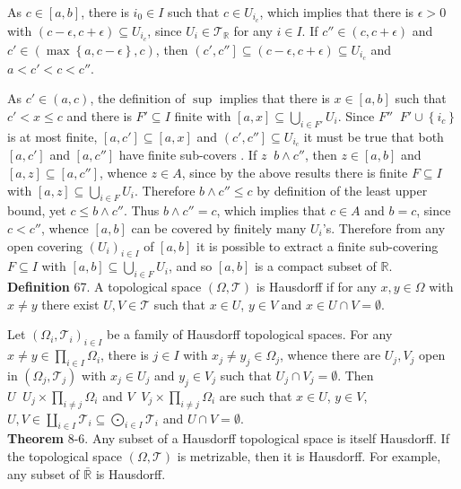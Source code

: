 \documentclass[a4paper]{article}
\newcommand{\obj}[1]{\left\{ #1 \right \}}
\newcommand{\clo}[1]{\left [ #1 \right ]}
\newcommand{\ploc}[1]{\left ( #1 \right ]}
\newcommand{\brac}[1]{\left ( #1 \right )}
\newcommand{\Rbar}{{\bar{\mathbb{R}}}}
\newcommand{\Real}{\mathbb{R}}
\newcommand{\Tcal}{\mathcal{T}}
\newcommand{\defn}{\mathop{\overset{\Delta}{=}}\nolimits}
\begin{document}
As $c\in \clo{a,b}$, there is $i_0\in I$ such that $c\in U_{i_c}$, which implies that there is $\epsilon>0$ with $\brac{c-\epsilon, c+\epsilon} \subseteq U_{i_c}$, since $U_i\in \Tcal_\Real$ for any $i\in I$. If $c'' \in \brac{c, c+\epsilon}$ and $c'\in \brac{\max\obj{a, c-\epsilon}, c}$, then $\ploc{c', c''}\subseteq \brac{c-\epsilon, c+\epsilon} \subseteq U_{i_c}$ and $a < c'< c < c''$.

As $c'\in \brac{a, c}$, the definition of $\sup$ implies that there is $x\in \clo{a,b}$ such that $c'< x \leq c$ and there is $F'\subseteq I$ finite with $\clo{a,x}\subseteq \bigcup_{i\in F'} U_i$. Since $F''\defn F'\cup \obj{i_c}$ is at most finite, $\clo{a, c'}\subseteq \clo{a,x}$ and $\ploc{c', c''}\subseteq U_{i_c}$ it must be true that both $\clo{a, c'}$ and $\clo{a, c''}$ have finite sub-covers . If $z\defn b\wedge c''$, then $z\in \clo{a,b}$ and $\clo{a,z}\subseteq \clo{a,c''}$, whence $z\in A$, since by the above results there is finite $F\subseteq I$ with $\clo{a,z}\subseteq \bigcup_{i\in F} U_i$. Therefore $b\wedge c''\leq c$ by definition of the least upper bound, yet $c\leq b\wedge c''$. Thus $b\wedge c'' = c$, which implies that $c\in A$ and $b = c$, since $c < c''$, whence $\clo{a,b}$ can be covered by finitely many $U_i$'s. Therefore from any open covering $\brac{U_i}_{i\in I}$ of $\clo{a,b}$ it is possible to extract a finite sub-covering $F\subseteq I$ with $\clo{a,b}\subseteq \bigcup_{i\in F} U_i$, and so $\clo{a,b}$ is a compact subset of $\Real$.\\

\noindent \textbf{Definition} 67.
A topological space $\brac{\Omega, \Tcal}$ is Hausdorff if for any $x, y\in \Omega$ with $x\neq y$ there exist $U,V\in \Tcal$ such that $x\in U$, $y\in V$ and $x\in U\cap V = \emptyset$.

Let $\brac{\Omega_i, \Tcal_i}_{i \in I}$ be a family of Hausdorff topological spaces. For any $x\neq y\in \prod_{i\in I}\Omega_i$, there is $j\in I$ with $x_j\neq y_j\in \Omega_j$, whence there are $U_j, V_j$ open in $\brac{\Omega_j, \Tcal_j}$ with $x_j\in U_j$ and $y_j\in V_j$ such that $U_j\cap V_j = \emptyset$. Then $U\defn U_j\times \prod_{i\neq j} \Omega_i$ and $V\defn V_j\times \prod_{i\neq j} \Omega_i$ are such that $x\in U$, $y\in V$, $U,V\in \coprod_{i\in I}\Tcal_i\subseteq \bigodot_{i\in I}\Tcal_i$ and $U\cap V=\emptyset$.\\

\label{thm:hausdorf_metric} \noindent \textbf{Theorem} 8-6.
Any subset of a Hausdorff topological space is itself Hausdorff. If the topological space $\brac{\Omega, \Tcal}$ is metrizable, then it is Hausdorff. For example, any subset of $\Rbar$ is Hausdorff.
\end{document}
